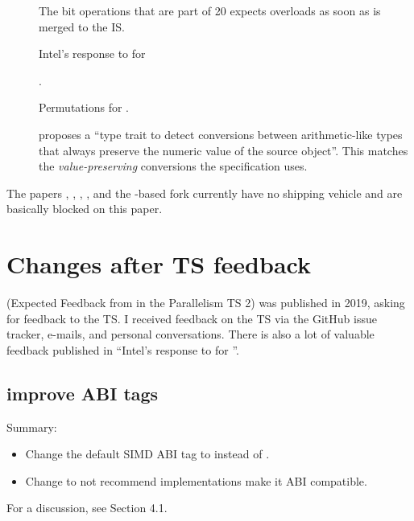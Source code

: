 \begin{description}
  \item[] The bit operations that are part of \CC{}20 expects  overloads as soon as  is merged to the IS.

  \item[] Intel’s response to  for 

  \item[] .

  \item[] Permutations for .

  \item[] \textcite{P2509R0} proposes a ``type trait to detect
    conversions between arithmetic-like types that always preserve the numeric
    value of the source object''. This matches the \textit{value-preserving}
    conversions the  specification uses.
\end{description}
The papers , , , , and
the -based  fork currently have no shipping vehicle
and are basically blocked on this paper.

\section{Changes after TS feedback}\label{sec:changes}
\cite{P1915R0} (Expected Feedback from  in the Parallelism TS 2) was published in 2019, asking for feedback to the TS.
I received feedback on the TS via the GitHub issue tracker, e-mails, and personal conversations.
There is also a lot of valuable feedback published in  ``Intel’s response to  for \std{}''.

\subsection{improve ABI tags}
Summary:
\begin{itemize}
  \item Change the default SIMD ABI tag to \simdabi{} instead of \simdabi{}.
  \item Change \simdabi{} to not recommend implementations make it ABI compatible.
\end{itemize}

For a discussion, see  Section 4.1.

